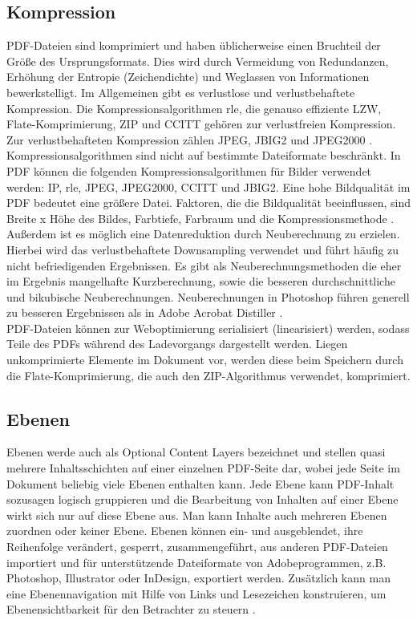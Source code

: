 \subsection{Kompression}
PDF-Dateien sind komprimiert und haben üblicherweise einen Bruchteil der Größe des Ursprungsformats. Dies wird durch Vermeidung von Redundanzen, Erhöhung der Entropie (Zeichendichte) und Weglassen von Informationen bewerkstelligt. Im Allgemeinen gibt es verlustlose und verlustbehaftete Kompression. Die Kompressionsalgorithmen \gls{rle}, die genauso effiziente LZW, Flate-Komprimierung, ZIP und CCITT gehören zur verlustfreien Kompression. Zur verlustbehafteten Kompression zählen JPEG, JBIG2 und JPEG2000 \cite{schneeberger}.  Kompressionsalgorithmen sind nicht auf bestimmte Dateiformate beschränkt. In PDF können die folgenden Kompressionsalgorithmen für Bilder verwendet werden: IP, \gls{rle}, JPEG, JPEG2000, CCITT und JBIG2. Eine hohe Bildqualität im PDF bedeutet eine größere Datei. Faktoren, die die Bildqualität beeinflussen, sind Breite x Höhe des Bildes, Farbtiefe, Farbraum und die Kompressionsmethode \cite{softx}. \\
Außerdem ist es möglich eine Datenreduktion durch Neuberechnung zu erzielen. Hierbei wird das verlustbehaftete Downsampling verwendet und führt häufig zu nicht befriedigenden Ergebnissen. Es gibt als Neuberechnungsmethoden die eher im Ergebnis mangelhafte Kurzberechnung, sowie die besseren durchschnittliche und bikubische Neuberechnungen. Neuberechnungen in Photoshop führen generell zu besseren Ergebnissen als in Adobe Acrobat Distiller \cite{schneeberger}. \\
PDF-Dateien können zur Weboptimierung serialisiert (linearisiert) werden, sodass Teile des PDFs während des Ladevorgangs dargestellt werden. Liegen unkomprimierte Elemente im Dokument vor, werden diese beim Speichern durch die Flate-Komprimierung, die auch den ZIP-Algorithmus verwendet, komprimiert.

\subsection{Ebenen}
Ebenen werde auch als Optional Content Layers bezeichnet und stellen quasi mehrere Inhaltsschichten auf einer einzelnen PDF-Seite dar, wobei jede Seite im Dokument beliebig viele Ebenen enthalten kann. Jede Ebene kann PDF-Inhalt sozusagen logisch gruppieren und die Bearbeitung von Inhalten auf einer Ebene wirkt sich nur auf diese Ebene aus. Man kann Inhalte auch mehreren Ebenen zuordnen oder keiner Ebene. Ebenen können ein- und ausgeblendet, ihre Reihenfolge verändert, gesperrt, zusammengeführt, aus anderen PDF-Dateien importiert und für unterstützende Dateiformate von Adobeprogrammen, z.B. Photoshop, Illustrator oder InDesign, exportiert werden. Zusätzlich kann man eine Ebenennavigation mit Hilfe von Links und Lesezeichen konstruieren, um Ebenensichtbarkeit für den Betrachter zu steuern \cite{adobe-ebenen}. 

